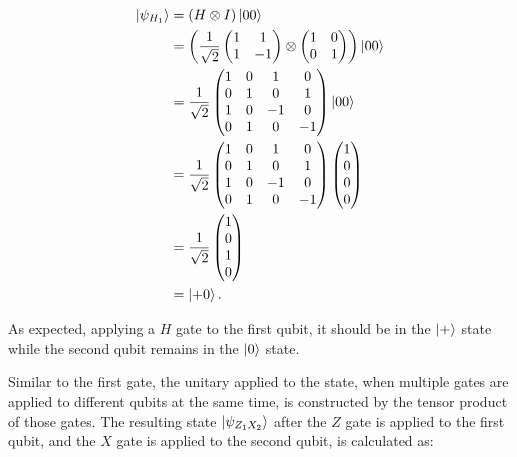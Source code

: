 \begin{align}
  \Ket{\psi_{H_1}}  &= (H \otimes I) \Ket{00} \\
                   &= \left(\frac{1}{\sqrt{2}} \begin{pmatrix} 1 & 1 \\ 1 & -1 \end{pmatrix} \otimes \begin{pmatrix} 1 & 0 \\ 0 & 1 \end{pmatrix}\right) \Ket{00} \\
                    &= \frac{1}{\sqrt{2}} \begin{pmatrix} 1 & 0 & 1 & 0 \\ 0 & 1 & 0 & 1 \\ 1 & 0 & -1 & 0 \\ 0 & 1 & 0 & -1 \end{pmatrix} \Ket{00} \\
                    &= \frac{1}{\sqrt{2}} \begin{pmatrix} 1 & 0 & 1 & 0 \\ 0 & 1 & 0 & 1 \\ 1 & 0 & -1 & 0 \\ 0 & 1 & 0 & -1 \end{pmatrix} \begin{pmatrix} 1 \\ 0 \\ 0 \\ 0 \end{pmatrix} \\
                    &= \frac{1}{\sqrt{2}} \begin{pmatrix} 1 \\ 0 \\ 1 \\ 0 \end{pmatrix} \\
                    &= \Ket{+0}.
\end{align}

As expected, applying a $H$ gate to the first
qubit, it should be in the $\Ket{+}$ state while the second qubit remains in
the $\Ket{0}$ state.

Similar to the first gate, the unitary applied to the state, when multiple
gates are applied to different qubits at the same time, is constructed by the
tensor product of those gates. The resulting state $\Ket{\psi_{Z_1X_2}}$ after the $Z$
gate is applied to the first qubit, and the $X$ gate is applied to the second qubit, is
calculated as:

